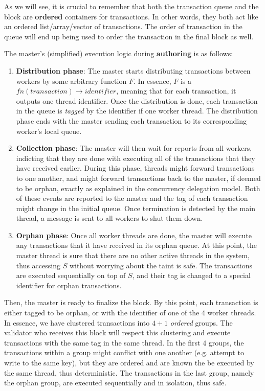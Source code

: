 \begin{remark}
	As we will see, it is crucial to remember that both the transaction queue and the block are
	\textbf{ordered} containers for transactions. In other words, they both act like an ordered
	list/array/vector of transactions. The order of transaction in the queue will end up being used
	to order the transaction in the final block as well.
\end{remark}

The master's (simplified) execution logic during \textbf{authoring} is as follows:

\begin{enumerate}
	\item \textbf{Distribution phase}: The master starts distributing transactions between workers
	by some arbitrary function $F$. In essence, $F$ is a $fn(transaction) \rightarrow identifier$,
	meaning that for each transaction, it outputs one thread identifier. Once the distribution is
	done, each transaction in the queue is \textit{tagged} by the identifier if one worker thread.
	The distribution phase ends with the master sending each transaction to its corresponding
	worker's local queue.

	\item \textbf{Collection phase}: The master will then wait for reports from all workers,
	indicting that they are done with executing all of the transactions that they have received
	earlier. During this phase, threads might forward transactions to one another, and might forward
	transactions back to the master, if deemed to be orphan, exactly as explained in the concurrency
	delegation model. Both of these events are reported to the master and the tag of each
	transaction might change in the initial queue. Once termination is detected by the main thread,
	a message is sent to all workers to shut them down.

	\item \textbf{Orphan phase}: Once all worker threads are done, the master will execute any
	transactions that it have received in its orphan queue. At this point, the master thread is sure
	that there are no other active threads in the system, thus accessing $S$ without worrying about
	the taint is safe. The transactions are executed sequentially on top of $S$, and their tag is
	changed to a special identifier for orphan transactions.
\end{enumerate}

Then, the master is ready to finalize the block. By this point, each transaction is either tagged to
be orphan, or with the identifier of one of the $4$ worker threads. In essence, we have clustered
transactions into $4 + 1$ \textit{ordered} groups. The validator who receives this block will
respect this clustering and execute transactions with the same tag in the same thread. In the first
$4$ groups, the transactions within a group might conflict with one another (e.g. attempt to write
to the same key), but they are ordered and are known the be executed by the same thread, thus
deterministic. The transactions in the last group, namely the orphan group, are executed
sequentially and in isolation, thus safe.


